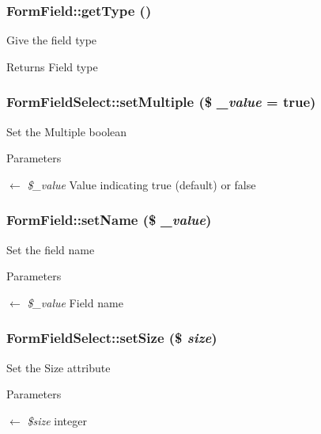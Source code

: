 \subsubsection[{getType}]{\setlength{\rightskip}{0pt plus 5cm}FormField::getType ()}\label{classFormField_a1f64b737bccb6b2827f8c5665b9920c7}
Give the field type \begin{DoxyReturn}{Returns}
Field type 
\end{DoxyReturn}
\subsubsection[{setMultiple}]{\setlength{\rightskip}{0pt plus 5cm}FormFieldSelect::setMultiple (\$ {\em \_\-value} = {\ttfamily true})}\label{classFormFieldSelect_aa69374c1f0692d691e7899f3ed14a42e}
Set the Multiple boolean 
\begin{DoxyParams}{Parameters}
\item[\mbox{$\leftarrow$} {\em \$\_\-value}]Value indicating true (default) or false \end{DoxyParams}
\subsubsection[{setName}]{\setlength{\rightskip}{0pt plus 5cm}FormField::setName (\$ {\em \_\-value})}\label{classFormField_ad57e32bd53170af060e869b3b60f0ef7}
Set the field name 
\begin{DoxyParams}{Parameters}
\item[\mbox{$\leftarrow$} {\em \$\_\-value}]Field name \end{DoxyParams}
\subsubsection[{setSize}]{\setlength{\rightskip}{0pt plus 5cm}FormFieldSelect::setSize (\$ {\em size})}\label{classFormFieldSelect_ad8ae8dcf6f6763cb32966eeca33c472b}
Set the Size attribute 
\begin{DoxyParams}{Parameters}
\item[\mbox{$\leftarrow$} {\em \$size}]integer \end{DoxyParams}


